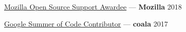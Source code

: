 \href{https://docs.naveenkumarsangi.me/moss.pdf}{Mozilla Open Source Support Awardee} --- \textbf{Mozilla} \hfill 2018

\href{https://docs.naveenkumarsangi.me/gsoc-mentee.pdf}{Google Summer of Code Contributor} --- \textbf{coala} \hfill 2017
